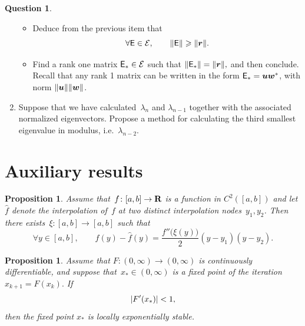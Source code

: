 \documentclass[10pt]{article}
\theoremstyle{definition}
\newtheorem{question}{Question}
\theoremstyle{remark}
\theoremstyle{plain}%
\newtheorem{proposition}[theorem]{Proposition}
\begin{document}
\begin{question}
\begin{enumerate}
\begin{itemize}
                \item
                    Deduce from the previous item that
                    \[
                        \forall \mathsf E \in \mathcal E, \qquad
                        \lVert\mathsf E\rVert \geqslant \lVert\mathbf{\boldsymbol{r}}\rVert.
                    \]

                \item
                    Find a rank one matrix $\mathsf E_* \in \mathcal E$ such that
                    \(
                    \lVert\mathsf E_*\rVert = \lVert\mathbf{\boldsymbol{r}}\rVert,
                    \)
                    and then conclude.
                    Recall that any rank 1 matrix can be written in the form $\mathsf E_* = \mathbf{\boldsymbol{u}} \mathbf{\boldsymbol{w}}^*$,
                    with norm $\lVert\mathbf{\boldsymbol{u}}\rVert \lVert\mathbf{\boldsymbol{w}}\rVert$.
            \end{itemize}

        \item
            Suppose that we have calculated~$\lambda_n$ and $\lambda_{n-1}$ together with the associated normalized eigenvectors.
            Propose a method for calculating the third smallest eigenvalue in modulus, i.e.\ $\lambda_{n-2}$.
    \end{enumerate}
\end{question}



\newpage

\section*{Auxiliary results}
\begin{proposition}
    \label{proposition:interpolation_error}
    Assume that~$f\colon [a, b] \to \mathbf R$ is a function in $C^{2}([a, b])$ and let $\widehat f$ denote
    the interpolation of~$f$ at two distinct interpolation nodes~$y_1, y_2$.
    Then there exists~$\xi\colon [a, b] \to [a, b]$ such that
    \[
        \forall y \in [a, b], \qquad
        f(y) - \widehat f(y) = \frac{f''\bigl(\xi(y)\bigr)}{2} (y-y_1) (y - y_2).
    \]
\end{proposition}

\begin{proposition}
    \label{proposition:local_convergence}
    Assume that $F\colon (0, \infty) \to (0, \infty)$ is continuously differentiable,
    and suppose that~$x_* \in (0, \infty)$ is a fixed point of the iteration
    \(
        x_{k+1} = F(x_k).
    \)
    If
    \[
        \lvert F'(x_*)\rvert < 1,
    \]
    then the fixed point $x_*$ is locally exponentially stable.
\end{proposition}
\end{document}
